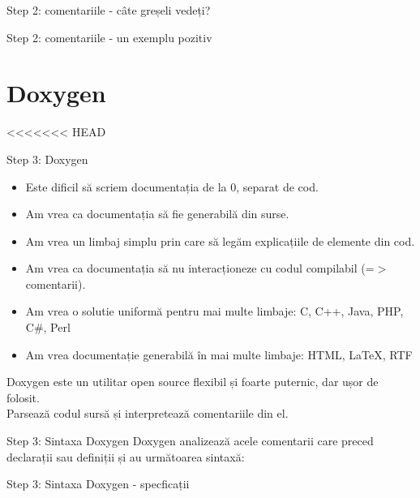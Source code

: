 \documentclass{beamer}
\begin{document}
\begin{frame}{Step 2: comentariile - câte greșeli vedeți?}
	
\end{frame}

\begin{frame}{Step 2: comentariile - un exemplu pozitiv}
	
\end{frame}

\section{Doxygen}

<<<<<<< HEAD
\begin{frame}{Step 3: Doxygen}
	\begin{itemize}	
		\item Este dificil să scriem documentația de la 0, separat de cod.
		\pause
		\item Am vrea ca documentația să fie generabilă din surse.
		\pause
		\item Am vrea un limbaj simplu prin care să legăm explicațiile de elemente din cod.
		\pause
		\item Am vrea ca documentația să nu interacționeze cu codul compilabil (=$>$ comentarii).
		\pause
		\item Am vrea o solutie uniformă pentru mai multe limbaje: C, C++, Java, PHP, C\#, Perl
		\pause
		\item Am vrea documentație generabilă în mai multe limbaje: HTML, LaTeX, RTF
	\end{itemize}
	Doxygen este un utilitar open source flexibil și foarte puternic, dar ușor de folosit. \pause \\
	Parsează codul sursă și interpretează comentariile din el.
\end{frame}

\begin{frame}{Step 3: Sintaxa Doxygen}
	Doxygen analizează acele comentarii care preced declarații sau definiții și au următoarea sintaxă: \\
	
\end{frame}

\begin{frame}{Step 3: Sintaxa Doxygen - specficații}
	
\end{frame}
\end{document}

